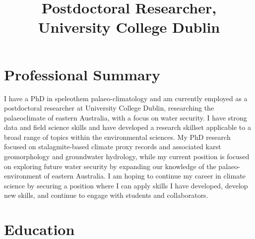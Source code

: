 \documentclass[11pt,a4paper,]{moderncv}
\title{Postdoctoral Researcher, University College Dublin}
\begin{document}
\makecvtitle



\hypertarget{professional-summary}{%
\section{Professional Summary}\label{professional-summary}}

I have a PhD in speleothem palaeo-climatology and am currently employed
as a postdoctoral researcher at University College Dublin, researching
the palaeoclimate of eastern Australia, with a focus on water security.
I have strong data and field science skills and have developed a
research skillset applicable to a broad range of topics within the
environmental sciences. My PhD research focused on stalagmite-based
climate proxy records and associated karst geomorphology and groundwater
hydrology, while my current position is focused on exploring future
water security by expanding our knowledge of the palaeo-environment of
eastern Australia. I am hoping to continue my career in climate science
by securing a position where I can apply skills I have developed,
develop new skills, and continue to engage with students and
collaborators.

\hypertarget{education}{%
\section{Education}\label{education}}

\nopagebreak
    \nopagebreak
\end{document}
